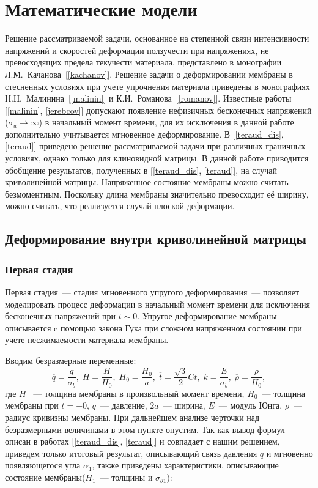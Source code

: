 \chapter{Математические модели}
\setcounter{figure}{1}
Решение рассматриваемой задачи, основанное на степенной связи интенсивности напряжений и скоростей деформации ползучести при напряжениях, не превосходящих предела текучести материала, представлено в монографии Л.М.~Качанова~[\ref{kachanov}].
Решение задачи о деформировании мембраны в стесненных условиях при учете упрочнения материала приведены в монографиях Н.Н.~Малинина~[\ref{malinin}] и К.И.~Романова~[\ref{romanov}]. Известные работы [\ref{malinin}, \ref{jerebcov}] допускают появление нефизичных бесконечных напряжений ($\sigma_u \to \infty$) в начальный момент времени, для их исключения в данной работе дополнительно учитывается мгновенное деформирование.
В [\ref{teraud_dis}, \ref{teraud}] приведено решение рассматриваемой задачи при различных граничных условиях, однако только для клиновидной матрицы. В данной работе приводится обобщение результатов, полученных в [\ref{teraud_dis}, \ref{teraud}], на случай криволинейной матрицы. Напряженное состояние мембраны можно считать безмоментным. Поскольку длина мембраны значительно превосходит её ширину, можно считать, что реализуется случай плоской деформации.

\section{Деформирование внутри криволинейной матрицы \label{section_1_1}}

	\subsection{Первая стадия}

Первая стадия~--- стадия мгновенного упругого деформирования~--- позволяет моделировать процесс деформации в начальный момент времени для исключения бесконечных
	напряжений при $t \sim 0$.
	Упругое деформирование мембраны описывается c помощью закона Гука при сложном напряженном состоянии при учете несжимаемости материала мембраны.
	
	
	Вводим безразмерные переменные:
	\begin{equation}
		\overline{q} = \dfrac{q}{\sigma_b}, \;
		\overline{H} = \dfrac{H}{H_0}, \;
		\overline{H}_0 = \dfrac{H_0}{a}, \;
		\overline{t} = \dfrac{\sqrt 3}{2}Ct,\;
		k = \dfrac{E}{\sigma_b},\;
		\overline{\rho} = \dfrac{\rho}{H_0},
	\end{equation}
	где $H$ ~--- толщина мембраны в произвольный момент времени, $H_0$~--- толщина мембраны при $t = -0$, $q$~--- давление, $2a$~--- ширина,
	$E$~--- модуль Юнга, $\rho$~--- радиус кривизны мембраны.
	При дальнейшем анализе черточки над безразмерными величинами в этом пункте  опустим. Так как вывод формул описан в работах  [\ref{teraud_dis}, \ref{teraud}]
	и совпадает с нашим решением, приведем только итоговый результат, описывающий связь давления $q$ и мгновенно появляющегося угла $\alpha_1$,
	также приведены характеристики, описывающие состояние мембраны($H_1$~--- толщины и $\sigma_{\theta1}$):

